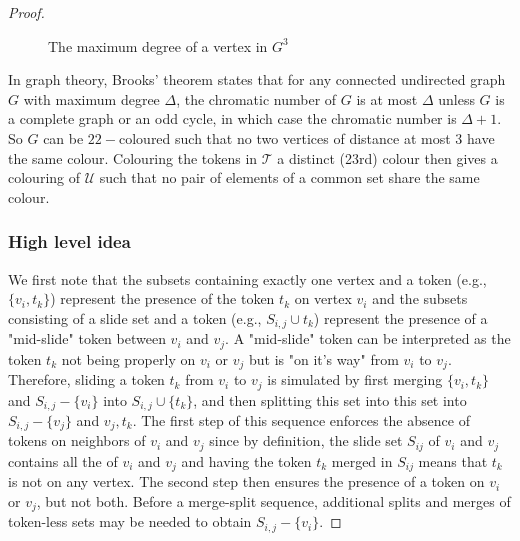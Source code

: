 \begin{proof}
\begin{figure} [H]
  \caption{The maximum degree of a vertex in $G^{3}$}
  \label{fig:subgraph}
\end{figure}

In graph theory, Brooks' theorem states that for any connected undirected graph $G$ with maximum degree $\Delta$, the chromatic number of
$G$ is at most $\Delta$ unless $G$ is a complete graph or an odd cycle, in which case the chromatic number is $\Delta + 1$.
So $G$ can be $22-$coloured such that no two vertices of distance at most $3$ have the same colour. Colouring the tokens in $\mathcal{T}$
a distinct (23rd) colour then gives a colouring of $\mathcal{U}$ such that no pair of elements of a common set share the same colour.

\subsubsection{High level idea}\label{subsubsection:high_level}
We first note that the subsets containing exactly one vertex and a token (e.g., $\{v_i, t_k\}$) represent the presence of the token
$t_k$ on vertex $v_i$ and the subsets consisting of a slide set and a token (e.g., $S_{i,j} \cup t_k$) represent the presence of a
"mid-slide" token between $v_i$ and $v_j$. A "mid-slide" token can be interpreted as the token $t_k$ not being properly on $v_i$ or $v_j$ but is
"on it's way" from $v_i$ to $v_j$. Therefore, sliding a token $t_k$ from $v_i$ to $v_j$ is simulated by first
merging $\{v_i, t_k\}$ and $S_{i,j}-\{v_i\}$ into $S_{i,j} \cup \{t_k\}$, and then splitting this set into this set into $S_{i,j}-\{v_j\}$
and ${v_j, t_k}$. The first step of this sequence enforces the absence of tokens on neighbors of $v_i$ and $v_j$ since by definition, the slide
set $S_{ij}$ of $v_i$ and $v_j$ contains all the of $v_i$ and $v_j$ and having the token $t_k$  merged in $S_{ij}$ means that $t_k$ is not on any
vertex. The second step then ensures the presence of a token on $v_i$ or $v_j$, but not both.
Before a merge-split sequence, additional splits and merges of token-less sets may be needed to obtain $S_{i,j}-\{v_i\}$.


\end{proof}
